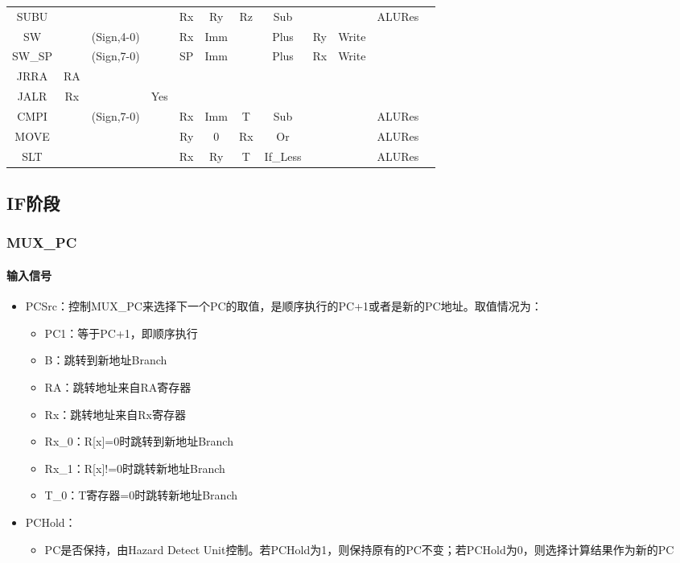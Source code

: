 \documentclass{article}
\begin{document}
\begin{table}
\begin{adjustbox}{max width=\textwidth}
\begin{tabular}[h]{c|c|c|c|c|c|c|c|c|c|c|c}
SUBU &  &  &  & Rx & Ry & Rz & Sub &  &  & ALURes & \\
SW &  & (Sign,4-0) &  & Rx & Imm &  & Plus & Ry & Write &  & \\
SW\_SP &  & (Sign,7-0) &  & SP & Imm &  & Plus & Rx & Write &  & \\
JRRA & RA &  &  &  &  &  &  &  &  &  & \\
JALR & Rx &  & Yes &  &  &  &  &  &  &  & \\
CMPI &  & (Sign,7-0) &  & Rx & Imm & T & Sub &  &  & ALURes & \\
MOVE &  &  &  & Ry & 0 & Rx & Or &  &  & ALURes & \\
SLT &  &  &  & Rx & Ry & T & If\_Less &  &  & ALURes & \\
\end{tabular}
\end{adjustbox}
\end{table}

\subsection{IF阶段}

\subsubsection{MUX\_PC}
\label{subsubsec:pc}
\paragraph{输入信号}
\begin{itemize}
\item PCSrc：控制MUX\_PC来选择下一个PC的取值，是顺序执行的PC+1或者是新的PC地址。取值情况为：
	\begin{itemize}
	\item PC1：等于PC+1，即顺序执行
	\item B：跳转到新地址Branch
	\item RA：跳转地址来自RA寄存器
	\item Rx：跳转地址来自Rx寄存器
	\item Rx\_0：R[x]=0时跳转到新地址Branch
	\item Rx\_1：R[x]!=0时跳转新地址Branch
	\item T\_0：T寄存器=0时跳转新地址Branch
	\end{itemize}
\item PCHold：
	\begin{itemize}
	\item PC是否保持，由Hazard Detect Unit控制。若PCHold为1，则保持原有的PC不变；若PCHold为0，则选择计算结果作为新的PC
	\end{itemize}
\end{itemize}
\end{document}
